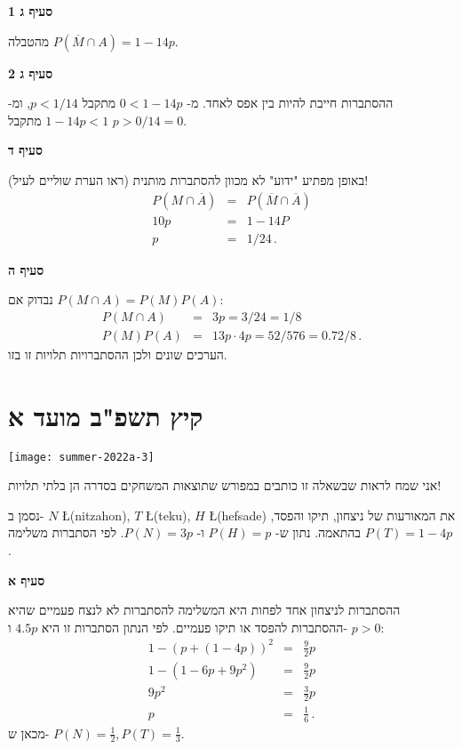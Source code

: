 \textbf{סעיף ג 1}

מהטבלה
$P(\overline{M}\cap A)=1-14p$.

\textbf{סעיף ג 2}

ההסתברות חייבת להיות בין אפס לאחד. מ-%
$0<1-14p$
מתקבל
$p<1/14$,
ומ-%
$1-14p<1$
מתקבל
$p>0/14=0$.

\textbf{סעיף ד}

באופן מפתיע "ידוע" לא מכוון להסתברות מותנית (ראו הערת שוליים לעיל)!
\begin{eqnarray*}
P(M\cap \overline{A})&=&P(\overline{M}\cap \overline{A})\\
10p&=&1-14P\\
p&=&1/24\,.
\end{eqnarray*}

\textbf{סעיף ה}

נבדוק אם
$P(M\cap A)=P(M)P(A)$:
\begin{eqnarray*}
P(M\cap A)&=& 3p=3/24=1/8\\
P(M)P(A)&=&13p\cdot 4p=52/576=0.72/8\,.
\end{eqnarray*}
הערכים שונים ולכן ההסתברויות תלויות זו בזו.


\newpage

\section{קיץ תשפ"ב מועד א}

\begin{center}
\texttt{[image: summer-2022a-3]}
\end{center}

אני שמח לראות שבשאלה זו כותבים במפורש שתוצאות המשחקים בסדרה הן בלתי תלויות!

נסמן ב-%
$N$ \L{(nitzahon)},
$T$ \L{(teku)},
$H$ \L{(hefsade)}
את המאורעות של ניצחון, תיקו והפסד, בהתאמה. נתון ש-%
$P(H)=p$
ו-%
$P(N)=3p$.
לפי הסתברות משלימה
$P(T)=1-4p$.

\textbf{סעיף א}

ההסתברות לניצחון אחד לפחות היא המשלימה להסתברות לא לנצח פעמיים שהיא ההסתברות להפסד או תיקו פעמיים. לפי הנתון הסתברות זו היא
$4.5p$
ו-%
$p>0$:
\begin{eqnarray*}
1-(p+(1-4p))^2&=&\tfrac{9}{2}p\\
1-(1-6p+9p^2)&=&\tfrac{9}{2}p\\
9p^2&=&\tfrac{3}{2}p\\
p&=&\tfrac{1}{6}\,.
\end{eqnarray*}
מכאן ש-%
$P(N)=\frac{1}{2}, P(T)=\frac{1}{3}$.

